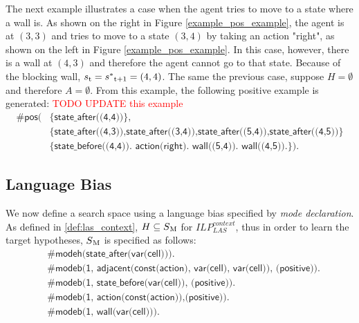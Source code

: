 \begin{examp}
The next example illustrates a case when the agent tries to move to a state where a wall is. As shown on the right in Figure \ref{example_pos_example}, the agent is at $(3,3)$ and tries to move to a state $(3,4)$ by taking an action "right", as shown on the left in Figure \ref{example_pos_example}. 
In this case, however, there is a wall at $(4,3)$ and therefore the agent cannot go to that state. Because of the blocking wall, $s\textsubscript{t} = s^*\textsubscript{t+1} = (4,4)$.
The same the previous case, suppose $H = \emptyset$ and therefore $A = \emptyset$.
From this example, the following positive example is generated:
\textcolor{red}{TODO UPDATE this example}
\begin{equation}
\begin{split}
\textsf{\#pos(} & \textsf{\{state\_after((4,4))\}}, \\
                & \textsf{\{state\_after((4,3)),state\_after((3,4)),state\_after((5,4)),state\_after((4,5))\}} \\
                & \textsf{\{state\_before((4,4)). action(right). wall((5,4)). wall((4,5)).\}).}
\end{split}
\end{equation}

\end{examp}
\label{state_transition_example}

\subsection{Language Bias}
\label{subsec:language_bias}
We now define a search space using a language bias specified by \textit{mode declaration}.
As defined in \ref{def:las_context}, $H \subseteq S\textsubscript{M}$ for $ILP_{LAS}^{context}$, thus in order to learn the target hypotheses, $S\textsubscript{M}$ is specified as follows:
\begin{equation} \label{eq:sm}
\begin{split}
&\textsf{\#modeh(state\_after(var(cell))).}\\
&\textsf{\#modeb(1, adjacent(const(action), var(cell), var(cell)), (positive)).} \\
&\textsf{\#modeb(1, state\_before(var(cell)), (positive)).} \\
&\textsf{\#modeb(1, action(const(action)),(positive)).} \\
&\textsf{\#modeb(1, wall(var(cell))).} \\
\end{split}
\end{equation}

